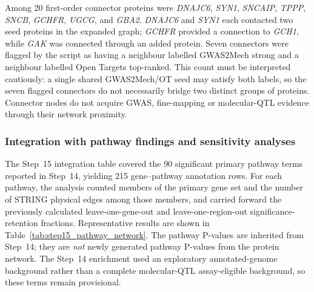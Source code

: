 \documentclass[11pt,a4paper]{article}
\begin{document}
Among 20 first-order connector proteins were \textit{DNAJC6}, \textit{SYN1}, \textit{SNCAIP}, \textit{TPPP}, \textit{SNCB}, \textit{GCHFR}, \textit{UGCG}, and \textit{GBA2}. \textit{DNAJC6} and \textit{SYN1} each contacted two seed proteins in the expanded graph; \textit{GCHFR} provided a connection to \textit{GCH1}, while \textit{GAK} was connected through an added protein. Seven connectors were flagged by the script as having a neighbour labelled GWAS2Mech strong and a neighbour labelled Open Targets top-ranked. This count must be interpreted cautiously: a single shared GWAS2Mech/OT seed may satisfy both labels, so the seven flagged connectors do not necessarily bridge two distinct groups of proteins. Connector nodes do not acquire GWAS, fine-mapping or molecular-QTL evidence through their network proximity.

\subsubsection{Integration with pathway findings and sensitivity analyses}
The Step~15 integration table covered the 90 significant primary pathway terms reported in Step~14, yielding 215 gene--pathway annotation rows. For each pathway, the analysis counted members of the primary gene set and the number of STRING physical edges among those members, and carried forward the previously calculated leave-one-gene-out and leave-one-region-out significance-retention fractions. Representative results are shown in Table~\ref{tab:step15_pathway_network}. The pathway P-values are inherited from Step~14; they are \emph{not} newly generated pathway P-values from the protein network. The Step~14 enrichment used an exploratory annotated-genome background rather than a complete molecular-QTL assay-eligible background, so these terms remain provisional.
\end{document}
